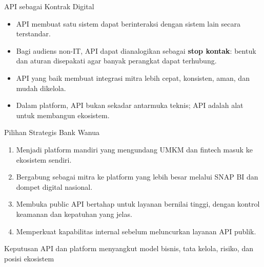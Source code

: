 \documentclass[aspectratio=169, table]{beamer}
\newcommand{\takeaway}[1]{%
  \vspace{4pt}
  {\footnotesize #1}
}
\begin{document}
\begin{frame}{API sebagai Kontrak Digital}
  \vspace{10pt}
  \begin{itemize}
    \item API membuat satu sistem dapat berinteraksi dengan sistem lain secara terstandar.
    \item Bagi audiens non-IT, API dapat dianalogikan sebagai \textbf{stop kontak}: bentuk dan aturan disepakati agar banyak perangkat dapat terhubung.
    \item API yang baik membuat integrasi mitra lebih cepat, konsisten, aman, dan mudah dikelola.
    \item Dalam platform, API bukan sekadar antarmuka teknis; API adalah alat untuk membangun ekosistem.
  \end{itemize}

  \vspace{8pt}
  \centering
\end{frame}

\begin{frame}{Pilihan Strategis Bank Wanua}
  \vspace{10pt}
  \begin{enumerate}
    \item Menjadi platform mandiri yang mengundang UMKM dan fintech masuk ke ekosistem sendiri.
    \item Bergabung sebagai mitra ke platform yang lebih besar melalui SNAP BI dan dompet digital nasional.
    \item Membuka public API bertahap untuk layanan bernilai tinggi, dengan kontrol keamanan dan kepatuhan yang jelas.
    \item Memperkuat kapabilitas internal sebelum meluncurkan layanan API publik.
  \end{enumerate}

  \takeaway{Keputusan API dan platform menyangkut model bisnis, tata kelola, risiko, dan posisi ekosistem}
\end{frame}
\end{document}

